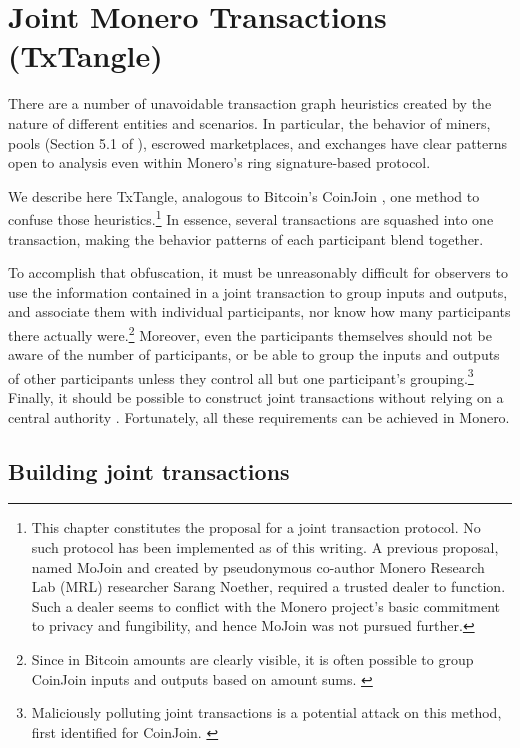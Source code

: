 \chapter{Joint Monero Transactions (TxTangle)}
\label{chapter:txtangle}

There are a number of unavoidable transaction graph heuristics created by the nature of different entities and scenarios. In particular, the behavior of miners, pools (Section 5.1 of \cite{AnalysisOfLinkability}), escrowed marketplaces, and exchanges have clear patterns open to analysis even within Monero's ring signature-based protocol.

We describe here TxTangle, analogous to Bitcoin's CoinJoin \cite{coinjoin-wiki}, one method to confuse those heuristics.\footnote{This chapter constitutes the proposal for a joint transaction protocol. No such protocol has been implemented as of this writing. A previous proposal, named MoJoin and created by pseudonymous co-author Monero Research Lab (MRL) researcher Sarang Noether, required a trusted dealer to function. Such a dealer seems to conflict with the Monero project's basic commitment to privacy and fungibility, and hence MoJoin was not pursued further.} In essence, several transactions are squashed into one transaction, making the behavior patterns of each participant blend together. 

To accomplish that obfuscation, it must be unreasonably difficult for observers to use the information contained in a joint transaction to group inputs and outputs, and associate them with individual participants, nor know how many participants there actually were.\footnote{Since in Bitcoin amounts are clearly visible, it is often possible to group CoinJoin inputs and outputs based on amount sums. \cite{coinjoin-sudoku}} Moreover, even the participants themselves should not be aware of the number of participants, or be able to group the inputs and outputs of other participants unless they control all but one participant's grouping.\footnote{Maliciously polluting joint transactions is a potential attack on this method, first identified for CoinJoin. \cite{coinjoin-pollution}} Finally, it should be possible to construct joint transactions without relying on a central authority \cite{exa-blockchain-analysis}. Fortunately, all these requirements can be achieved in Monero.



\section{Building joint transactions}
\label{sec:building-txtangle}

